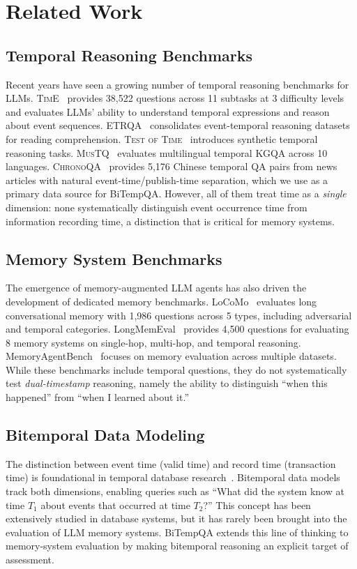 \section{Related Work}

\subsection{Temporal Reasoning Benchmarks}
Recent years have seen a growing number of temporal reasoning benchmarks for LLMs.
\textsc{TimE}~\citep{time2025} provides 38,522 questions across 11 subtasks at 3 difficulty levels and evaluates LLMs' ability to understand temporal expressions and reason about event sequences.
\textsc{ETRQA}~\citep{etrqa2024} consolidates event-temporal reasoning datasets for reading comprehension.
\textsc{Test of Time}~\citep{testoftime2025} introduces synthetic temporal reasoning tasks.
\textsc{MusTQ}~\citep{mustq2024} evaluates multilingual temporal KGQA across 10 languages.
\textsc{ChronoQA}~\citep{chronoqa2025} provides 5,176 Chinese temporal QA pairs from news articles with natural event-time/publish-time separation, which we use as a primary data source for BiTempQA.
However, all of them treat time as a \emph{single} dimension: none systematically distinguish event occurrence time from information recording time, a distinction that is critical for memory systems.

\subsection{Memory System Benchmarks}
The emergence of memory-augmented LLM agents has also driven the development of dedicated memory benchmarks.
LoCoMo~\citep{locomo2024} evaluates long conversational memory with 1,986 questions across 5 types, including adversarial and temporal categories.
LongMemEval~\citep{longmemeval2024} provides 4,500 questions for evaluating 8 memory systems on single-hop, multi-hop, and temporal reasoning.
MemoryAgentBench~\citep{memoryagentbench2025} focuses on memory evaluation across multiple datasets.
While these benchmarks include temporal questions, they do not systematically test \emph{dual-timestamp} reasoning, namely the ability to distinguish ``when this happened'' from ``when I learned about it.''

\subsection{Bitemporal Data Modeling}
The distinction between event time (valid time) and record time (transaction time) is foundational in temporal database research~\citep{snodgrass1999tsql2,jensen1999temporal}.
Bitemporal data models track both dimensions, enabling queries such as ``What did the system know at time $T_1$ about events that occurred at time $T_2$?''
This concept has been extensively studied in database systems, but it has rarely been brought into the evaluation of LLM memory systems.
BiTempQA extends this line of thinking to memory-system evaluation by making bitemporal reasoning an explicit target of assessment.


